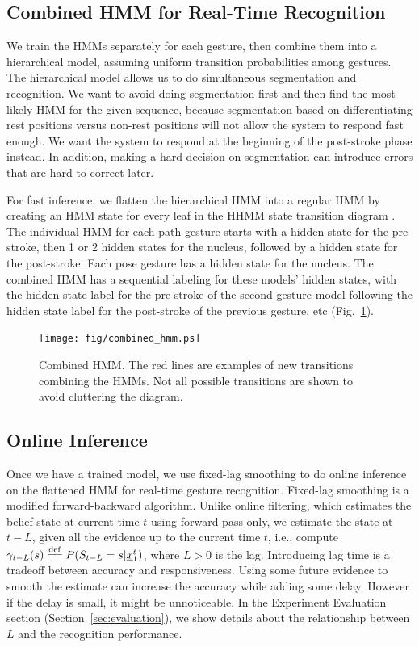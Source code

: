 \documentclass[conference]{IEEEtran}
\newcommand{\eqdef}{\overset{\mathrm{def}}{=\joinrel=}}
\begin{document}
\subsection{Combined HMM for Real-Time Recognition}
We train the HMMs separately for each gesture, then combine them into a 
hierarchical model, assuming uniform
transition probabilities among gestures. 
The hierarchical model allows us to do simultaneous segmentation and
recognition. We want to avoid doing segmentation first and then find the most
likely HMM for the given sequence, because segmentation based on
differentiating rest positions versus non-rest positions will not allow the
system to respond fast enough. We want the system to respond at the beginning of the
post-stroke phase instead. In
addition, making a hard decision on segmentation can introduce errors that
are hard to correct later. 

For fast inference, we
flatten the hierarchical HMM into a regular HMM by creating an HMM state for
every leaf in the HHMM state transition diagram \cite{murphy02}. The individual
HMM for each path gesture starts with a hidden state for the pre-stroke, then 1
or 2 hidden states for the nucleus, followed by a hidden state for the
post-stroke. Each pose gesture has a hidden state for the nucleus. The combined HMM has a sequential labeling for these models' hidden states, with the hidden state label for the pre-stroke of the second gesture model following
the hidden state label for the post-stroke of the previous gesture, etc
(Fig.~\ref{fig:combined}).

\begin{figure}[t]
\centering
\texttt{[image: fig/combined\_hmm.ps]}
\caption{Combined HMM. The red lines are examples of new transitions combining
the HMMs.
Not all possible transitions are shown to avoid cluttering the diagram.}
\label{fig:combined}
\end{figure}

\subsection{Online Inference}
Once we have a trained model, we use fixed-lag smoothing \cite{murphy02} to do
online inference on the flattened HMM for real-time gesture recognition.
Fixed-lag smoothing is a modified forward-backward algorithm. Unlike online
filtering, which estimates the belief state at current time $t$ using forward
pass only, we estimate the state at $t - L$, given all the evidence up to the
current time $t$, i.e., compute $\gamma_{t - L}(s) \eqdef P(S_{t -
L} = s|\underline{x}_1^t)$, where $L>0$ is the lag. Introducing lag time is a
tradeoff between accuracy and responsiveness. Using some future evidence to
smooth the estimate can increase the accuracy while adding some delay. However
if the delay is small, it might be unnoticeable.
In the Experiment Evaluation section (Section~\ref{sec:evaluation}), we show
details about the relationship between $L$ and the recognition performance.
\end{document}
